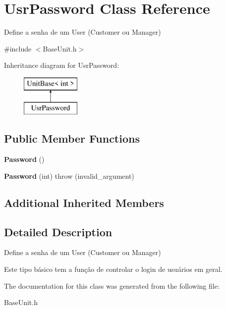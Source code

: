 \hypertarget{classUsrPassword}{\section{Usr\-Password Class Reference}
\label{classUsrPassword}
}


Define a senha de um User (Customer ou Manager)  




{\ttfamily \#include $<$Base\-Unit.\-h$>$}

Inheritance diagram for Usr\-Password\-:\begin{figure}[H]
\begin{center}
\leavevmode
\includegraphics[height=2.000000cm]{classUsrPassword}
\end{center}
\end{figure}
\subsection*{Public Member Functions}
\begin{DoxyCompactItemize}
\item 
\hypertarget{classUsrPassword_ad08a7c4a7e940186d4d23a5347ea7080}{{\bfseries Password} ()}\label{classUsrPassword_ad08a7c4a7e940186d4d23a5347ea7080}

\item 
\hypertarget{classUsrPassword_a42ff4b71c0c413ae5db79ea2697cc7a6}{{\bfseries Password} (int)  throw (invalid\-\_\-argument)}\label{classUsrPassword_a42ff4b71c0c413ae5db79ea2697cc7a6}

\end{DoxyCompactItemize}
\subsection*{Additional Inherited Members}


\subsection{Detailed Description}
Define a senha de um User (Customer ou Manager) 

Este tipo básico tem a função de controlar o login de usuários em geral. 

The documentation for this class was generated from the following file\-:\begin{DoxyCompactItemize}
\item 
Base\-Unit.\-h\end{DoxyCompactItemize}
